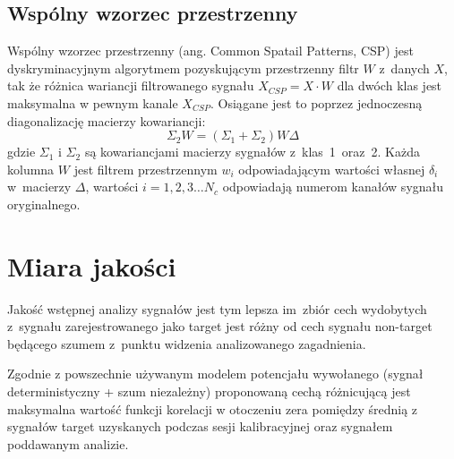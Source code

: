 \documentclass[licencjacka,openright]{pracamgr}
\begin{document}
\subsection{Wspólny wzorzec przestrzenny}
Wspólny wzorzec przestrzenny (ang. Common Spatail Patterns, CSP) \cite{koles1990} jest dyskryminacyjnym algorytmem pozyskującym przestrzenny filtr $W$ z~danych $X$, tak że różnica wariancji filtrowanego sygnału \mbox{$X_{CSP} = X \cdot W$} dla dwóch klas jest maksymalna w pewnym kanale $X_{CSP}$. Osiągane jest to poprzez jednoczesną diagonalizację macierzy kowariancji:
\begin{equation}
\Sigma _2 W = (\Sigma _1 + \Sigma _2 )W \Delta
\end{equation}
gdzie $\Sigma_1$ i $\Sigma_2$ są kowariancjami macierzy sygnałów z~klas~1~oraz~2. Każda kolumna $W$ jest filtrem przestrzennym $w_i$ odpowiadającym wartości własnej $\delta _i$ w~macierzy $\Delta$, wartości $i = 1,2,3 \ldots N_c$ odpowiadają numerom kanałów sygnału oryginalnego.%

\section{Miara jakości}
\label{miara}
Jakość wstępnej analizy sygnałów jest tym lepsza im~zbiór cech wydobytych z~sygnału zarejestrowanego jako target jest różny od cech sygnału non-target będącego szumem z~punktu widzenia analizowanego zagadnienia.

Zgodnie z powszechnie używanym modelem potencjału wywołanego (sygnał deterministyczny + szum niezależny) proponowaną cechą  różnicującą jest maksymalna wartość funkcji korelacji w otoczeniu zera pomiędzy średnią z sygnałów target uzyskanych podczas sesji kalibracyjnej oraz sygnałem poddawanym analizie.
\end{document}
